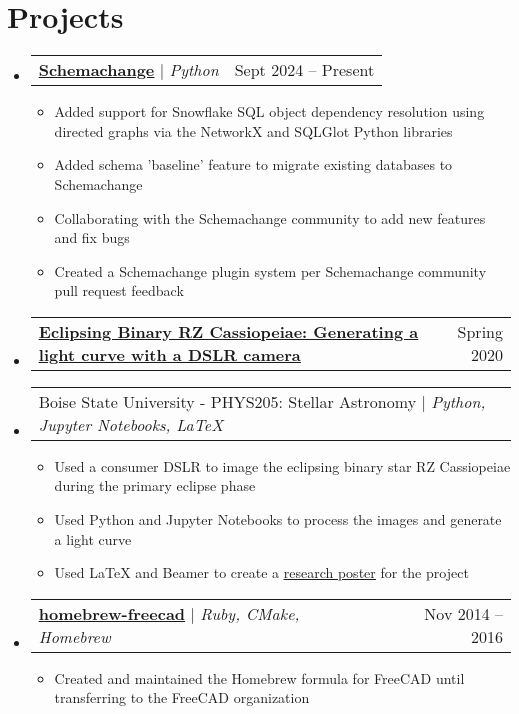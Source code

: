 \documentclass[letterpaper,10pt]{article}
\makeatletter
\newcommand{\resumeItem}[1]{
  \item\small{
    {#1 \vspace{-2pt}}
  }
}
\newcommand{\resumeProjectHeading}[2]{
    \item
    \begin{tabular*}{0.97\textwidth}{l@{\extracolsep{\fill}}r}
      \small#1 & #2 \\
    \end{tabular*}\vspace{-7pt}
}
\newcommand{\resumeSubHeadingListStart}{\begin{itemize}[leftmargin=0.15in, label={}]}
\newcommand{\resumeSubHeadingListEnd}{\end{itemize}}
\newcommand{\resumeItemListStart}{\begin{itemize}}
\newcommand{\resumeItemListEnd}{\end{itemize}\vspace{-5pt}}
\makeatother
\begin{document}
\section{Projects}
    \resumeSubHeadingListStart
      \resumeProjectHeading
          {\textbf{\href{https://github.com/sanelson/schemachange}{\uline{Schemachange}}} $|$ \emph{Python}}{Sept 2024 -- Present}
          \resumeItemListStart
            \resumeItem{Added support for Snowflake SQL object dependency resolution using directed graphs via the NetworkX and SQLGlot Python libraries}
            \resumeItem{Added schema 'baseline' feature to migrate existing databases to Schemachange}
            \resumeItem{Collaborating with the Schemachange community to add new features and fix bugs}
            \resumeItem{Created a Schemachange plugin system per Schemachange community pull request feedback}
          \resumeItemListEnd
      \resumeProjectHeading
          {\textbf{\href{https://github.com/sanelson/PHYS205/blob/master/observing_project/poster.pdf}{\uline{Eclipsing Binary RZ Cassiopeiae: Generating a light curve with
a DSLR camera}}}}{Spring 2020}
      \resumeProjectHeading{Boise State University - PHYS205: Stellar Astronomy $|$ \emph{Python, Jupyter Notebooks, LaTeX}}{}
          \resumeItemListStart
            \resumeItem{Used a consumer DSLR to image the eclipsing binary star RZ Cassiopeiae during the primary eclipse phase}
            \resumeItem{Used Python and Jupyter Notebooks to process the images and generate a light curve}
            \resumeItem{Used LaTeX and Beamer to create a \href{https://github.com/sanelson/PHYS205/blob/master/observing_project/poster.pdf}{\uline{research poster}} for the project}
          \resumeItemListEnd
      \resumeProjectHeading
          {\textbf{\href{https://github.com/FreeCAD/homebrew-freecad}{\uline{homebrew-freecad}}} $|$ \emph{Ruby, CMake, Homebrew}}{Nov 2014 -- 2016}
          \resumeItemListStart
            \resumeItem{Created and maintained the Homebrew formula for FreeCAD until transferring to the FreeCAD organization}
          \resumeItemListEnd
    \resumeSubHeadingListEnd

%

\end{document}
